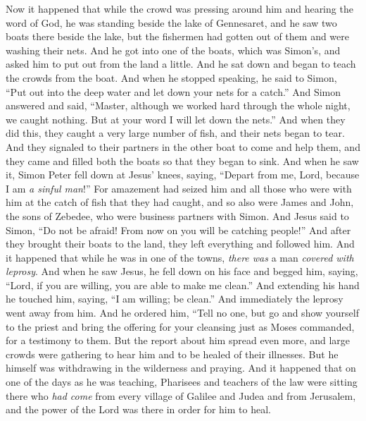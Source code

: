 \begin{biblechapter} %
 Now it happened that while the crowd was pressing around him and hearing the word of God, he was standing beside the lake of Gennesaret,
\verse and he saw two boats there beside the lake, but the fishermen had gotten out of them and were washing their nets.
\verse And he got into one of the boats, which was Simon’s, and asked him to put out from the land a little. And he sat down and began to teach the crowds from the boat.
\verse And when he stopped speaking, he said to Simon, “Put out into the deep water and let down your nets for a catch.”
\verse And Simon answered and said, “Master, although we worked hard through the whole night, we caught nothing. But at your word I will let down the nets.”
\verse And when they did this, they caught a very large number of fish, and their nets began to tear.
\verse And they signaled to their partners in the other boat to come and help them, and they came and filled both the boats so that they began to sink.
\verse And when he saw it, Simon Peter fell down at Jesus’ knees, saying, “Depart from me, Lord, because I am \textit{a sinful man}!”
\verse For amazement had seized him and all those who were with him at the catch of fish that they had caught,
\verse and so also were James and John, the sons of Zebedee, who were business partners with Simon. And Jesus said to Simon, “Do not be afraid! From now on you will be catching people!”
\verse And after they brought their boats to the land, they left everything and followed him.
 And it happened that while he was in one of the towns, \textit{there was} a man \textit{covered with leprosy}. And when he saw Jesus, he fell down on his face and begged him, saying, “Lord, if you are willing, you are able to make me clean.”
\verse And extending his hand he touched him, saying, “I am willing; be clean.” And immediately the leprosy went away from him.
\verse And he ordered him, “Tell no one, but go and show yourself to the priest and bring the offering for your cleansing just as Moses commanded, for a testimony to them.
\verse But the report about him spread even more, and large crowds were gathering to hear him and to be healed of their illnesses.
\verse But he himself was withdrawing in the wilderness and praying.
 And it happened that on one of the days as he was teaching, Pharisees and teachers of the law were sitting there who \textit{had come} from every village of Galilee and Judea and from Jerusalem, and the power of the Lord was there in order for him to heal.

\end{biblechapter}
